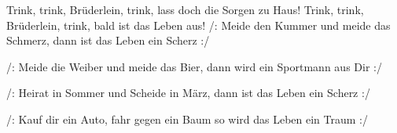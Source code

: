 
  
\beginverse*
Trink, trink, Brüderlein, trink,
lass doch die Sorgen zu Haus!
Trink, trink, Brüderlein, trink,
bald ist das Leben aus!
/: Meide den Kummer und meide das Schmerz,
dann ist das Leben ein Scherz :/
\endverse

\beginverse*
/: Meide die Weiber und meide das Bier,
dann wird ein Sportmann aus Dir :/
\endverse

\beginverse*
/: Heirat in Sommer und Scheide in März,
dann ist das Leben ein Scherz :/
\endverse

\beginverse*
/: Kauf dir ein Auto, fahr gegen ein Baum
so wird das Leben ein Traum :/
\endverse

\endsong
